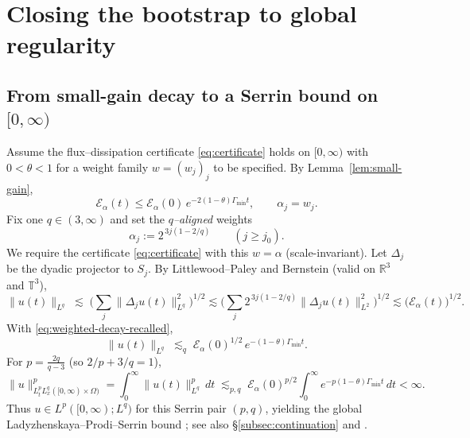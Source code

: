 \IfFileExists{nyjm.cls}{\documentclass[11pt]{nyjm}}{\documentclass[11pt]{amsart}}
\newcommand{\R}{\mathbb{R}}
\newcommand{\T}{\mathbb{T}}
\theoremstyle{plain}
\theoremstyle{definition}
\theoremstyle{remark}
\begin{document}
\section{Closing the bootstrap to global regularity}\label{sec:bootstrap}

\subsection{From small-gain decay to a Serrin bound on $[0,\infty)$}\label{subsec:bootstrap-serrin}
Assume the flux–dissipation certificate \eqref{eq:certificate} holds on $[0,\infty)$ with $0<\theta<1$ for a weight family $w=(w_j)_j$ to be specified. By Lemma~\ref{lem:small-gain},
\begin{equation}\label{eq:weighted-decay-recalled}
\mathcal E_\alpha(t)\le \mathcal E_\alpha(0)\,e^{-2(1-\theta)\Gamma_{\min} t},\qquad \alpha_j=w_j.
\end{equation}
Fix one $q\in(3,\infty)$ and set the \emph{$q$–aligned} weights
\begin{equation}\label{eq:q-weights}
\alpha_j:=2^{\,3j(1-2/q)}\qquad(j\ge j_0).
\end{equation}
We require the certificate \eqref{eq:certificate} with this $w=\alpha$ (scale-invariant). Let $\Delta_j$ be the dyadic projector to $S_j$. By Littlewood–Paley and Bernstein (valid on $\R^3$ and $\T^3$),
\[
\|u(t)\|_{L^q}\;\lesssim\;\Big(\sum_j \|\Delta_j u(t)\|_{L^q}^2\Big)^{1/2}
\lesssim \Big(\sum_j 2^{\,3j(1-2/q)} \|\Delta_j u(t)\|_{L^2}^2\Big)^{1/2}
\lesssim \big(\mathcal E_\alpha(t)\big)^{1/2}.
\]
With \eqref{eq:weighted-decay-recalled},
\begin{equation}\label{eq:LP-serrin}
\|u(t)\|_{L^q}\;\lesssim_q\; \mathcal E_\alpha(0)^{1/2}\,e^{-(1-\theta)\Gamma_{\min} t}.
\end{equation}
For $p=\tfrac{2q}{q-3}$ (so $2/p+3/q=1$),
\[
\|u\|_{L^p_tL^q_x([0,\infty)\times\Omega)}^p
=\int_0^\infty \|u(t)\|_{L^q}^p\,dt
\;\lesssim_{p,q}\; \mathcal E_\alpha(0)^{p/2}\!\int_0^\infty e^{-p(1-\theta)\Gamma_{\min} t}\,dt
<\infty.
\]
Thus $u\in L^p([0,\infty);L^q)$ for this Serrin pair $(p,q)$, yielding the global Ladyzhenskaya–Prodi–Serrin bound \cite{Serrin1963,Temam2001,ConstantinFoias1988}; see also \S\ref{subsec:continuation} and \cite{BealeKatoMajda1984,KochTataru2001,EscauriazaSereginSverak2003}.
\end{document}
